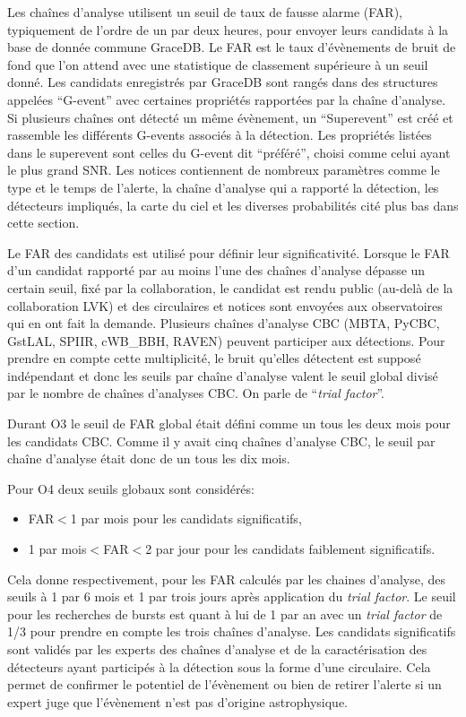 Les chaînes d'analyse utilisent un seuil de taux de fausse alarme (FAR), typiquement de l'ordre de un par deux heures, pour envoyer leurs candidats à la base de donnée commune GraceDB.
Le FAR est le taux d'évènements de bruit de fond que l'on attend avec une statistique de classement supérieure à un seuil donné.
Les candidats enregistrés par GraceDB sont rangés dans des structures appelées ``G-event''  avec certaines propriétés rapportées par la chaîne d'analyse.
Si plusieurs chaînes ont détecté un même évènement, un ``Superevent'' est créé et rassemble les différents G-events associés à la détection.
Les propriétés listées dans le superevent sont celles du G-event dit ``préféré'', choisi comme celui ayant le plus grand SNR.
Les notices contiennent de nombreux paramètres comme le type et le temps de l'alerte, la chaîne d'analyse qui a rapporté la détection, les détecteurs impliqués, la carte du ciel et les diverses probabilités cité plus bas dans cette section.

Le FAR des candidats est utilisé pour définir leur significativité.
Lorsque le FAR d'un candidat rapporté par au moins l'une des chaînes d'analyse dépasse un certain seuil, fixé par la collaboration, le candidat est rendu public (au-delà de la collaboration LVK) et des circulaires et notices sont envoyées aux observatoires qui en ont fait la demande.
Plusieurs chaînes d'analyse CBC (MBTA, PyCBC, GstLAL, SPIIR, cWB\_BBH, RAVEN) peuvent participer aux détections.
Pour prendre en compte cette multiplicité, le bruit qu'elles détectent est supposé indépendant et donc les seuils par chaîne d'analyse valent le seuil global divisé par le nombre de chaînes d'analyses CBC.
On parle de ``\textit{trial factor}''.

Durant O3 le seuil de FAR global était défini comme un tous les deux mois pour les candidats CBC.
Comme il y avait cinq chaînes d'analyse CBC, le seuil par chaîne d'analyse était donc de un tous les dix mois.

Pour O4 deux seuils globaux sont considérés:
\begin{itemize}
\item FAR$<$1 par mois pour les candidats significatifs,
\item 1 par mois$<$FAR$<$2 par jour pour les candidats faiblement significatifs.
\end{itemize}
Cela donne respectivement, pour les FAR calculés par les chaines d'analyse, des seuils à 1 par 6 mois et 1 par trois jours après application du \textit{trial factor}.
%
Le seuil pour les recherches de bursts est quant à lui de 1 par an avec un \textit{trial factor} de 1/3 pour prendre en compte les trois chaînes d'analyse.
Les candidats significatifs sont validés par les experts des chaînes d'analyse et de la caractérisation des détecteurs ayant participés à la détection sous la forme d'une circulaire.
Cela permet de confirmer le potentiel de l'évènement ou bien de retirer l'alerte si un expert juge que l'évènement n'est pas d'origine astrophysique.

